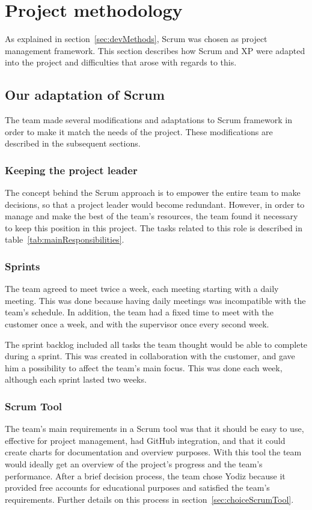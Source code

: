 \section{Project methodology}
\label{sec:scrumDevProcess}

As explained in section~\ref{sec:devMethods}, Scrum was chosen as project management framework. 
This section describes how Scrum and XP were adapted into the project and difficulties that arose with regards to this.

\subsection{Our adaptation of Scrum}
The team made several modifications and adaptations to Scrum framework in order to make it match the needs of the project. These modifications are described in the subsequent sections.

\subsubsection{Keeping the project leader}
The concept behind the Scrum approach is to empower the entire team to make decisions, so that a project leader would become redundant. However, in order to manage and make the best of the team's resources, the team found it necessary to keep this position in this project. The tasks related to this role is described in table~\ref{tab:mainResponsibilities}.

\subsubsection{Sprints}
The team agreed to meet twice a week, each meeting starting with a daily meeting. This was done because having daily meetings was incompatible with the team's schedule. In addition, the team had a fixed time to meet with the customer once a week, and with the supervisor once every second week.

The sprint backlog included all tasks the team thought would be able to complete during a sprint. This was created in collaboration with the customer, and gave him a possibility to affect the team's main focus. This was done each week, although each sprint lasted two weeks.

\subsubsection{Scrum Tool}
\label{sec:scrumtool}
The team's main requirements in a Scrum tool was that it should be easy to use, effective for project management, had GitHub integration, and that it could create charts for documentation and overview purposes. With this tool the team would ideally get an overview of the project's progress and the team's performance. After a brief decision process, the team chose Yodiz because it provided free accounts for educational purposes and satisfied the team's requirements. Further details on this process in section~\ref{sec:choiceScrumTool}.

